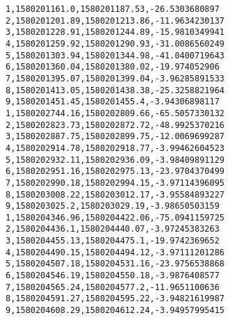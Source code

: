 \begin{lstlisting}[caption=log\_data.csv,label=log_data]
1,1580201161.0,1580201187.53,-26.5303680897
2,1580201201.89,1580201213.86,-11.9634230137
3,1580201228.91,1580201244.89,-15.9810349941
4,1580201259.92,1580201290.93,-31.0086560249
5,1580201303.94,1580201344.98,-41.0400719643
6,1580201360.04,1580201380.02,-19.974052906
7,1580201395.07,1580201399.04,-3.96285891533
8,1580201413.05,1580201438.38,-25.3258821964
9,1580201451.45,1580201455.4,-3.94306898117
1,1580202744.16,1580202809.66,-65.5057330132
2,1580202823.73,1580202872.72,-48.9925370216
3,1580202887.75,1580202899.75,-12.0069699287
4,1580202914.78,1580202918.77,-3.99462604523
5,1580202932.11,1580202936.09,-3.98409891129
6,1580202951.16,1580202975.13,-23.9704370499
7,1580202990.18,1580202994.15,-3.97114396095
8,1580203008.22,1580203012.17,-3.95584893227
9,1580203025.2,1580203029.19,-3.98650503159
1,1580204346.96,1580204422.06,-75.0941159725
2,1580204436.1,1580204440.07,-3.97245383263
3,1580204455.13,1580204475.1,-19.9742369652
4,1580204490.15,1580204494.12,-3.97111201286
5,1580204507.18,1580204531.16,-23.9756538868
6,1580204546.19,1580204550.18,-3.9876408577
7,1580204565.24,1580204577.2,-11.9651100636
8,1580204591.27,1580204595.22,-3.94821619987
9,1580204608.29,1580204612.24,-3.94957995415
\end{lstlisting}

